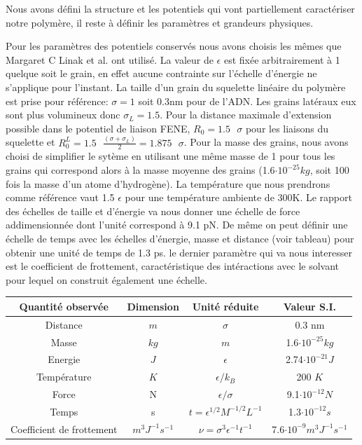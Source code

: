 Nous avons défini la structure et les potentiels qui vont partiellement caractériser notre polymère, il reste à définir les paramètres et grandeurs physiques.

Pour les paramètres des potentiels conservés nous avons choisis les mêmes que Margaret C Linak et al. \cite{jchem} ont utilisé. La valeur de $\epsilon$ est fixée arbitrairement à 1 quelque soit le grain, en effet aucune contrainte sur l'échelle d'énergie ne s'applique pour l'instant. La taille d'un grain du squelette linéaire du polymère est prise pour référence: $\sigma=1$ soit 0.3nm pour de l'ADN. Les grains latéraux eux sont plus volumineux donc $\sigma_{L}=1.5$. Pour la distance maximale d'extension possible dans le potentiel de liaison FENE, $R_0=1.5\text{ } \sigma$ pour les liaisons du squelette et $R_0^{L}=1.5 \text{ }\frac{(\sigma+\sigma_{L})}{2} = 1.875\text{ } \sigma$. Pour la masse des grains, nous avons choisi  de simplifier le sytème en utilisant une même masse de 1 pour tous les grains qui correspond alors à la masse moyenne des grains (1.6$\cdot 10^{-25} kg$, soit 100 fois la masse d'un atome d'hydrogène). La température que nous prendrons comme référence vaut 1.5 $\epsilon$ pour une température ambiente de 300K. Le rapport des échelles de taille et d'énergie va nous donner une échelle de force addimensionnée dont l'unité correspond à 9.1 pN. De même on peut définir une échelle de temps avec les échelles d'énergie, masse et distance (voir tableau) pour obtenir une unité de temps de 1.3 ps. le dernier paramètre qui va nous interesser est le coefficient de frottement, caractéristique des intéractions avec le solvant pour lequel on construit également une échelle.




\begin{center}


\begin{tabular}{|c|c|c|c|}
  \hline
  Quantité observée & Dimension & Unité réduite & Valeur S.I. \\
  \hline
  Distance & $m$ & $\sigma$ & 0.3 nm\\
  Masse & $kg$ & $m$ & 1.6$\cdot 10^{-25} kg$ \\
  Energie & $J$ & $\epsilon$ & 2.74$\cdot 10^{-21} J$\\
  Température & $K$ & $\epsilon/k_B$ & 200 $K$\\
  Force & N  & $\epsilon/\sigma$ & 9.1$\cdot 10^{-12} N$ \\
  Temps & s & $t=\epsilon^{1/2} M^{-1/2} L^{-1} $& 1.3$\cdot 10^{-12} s$\\
  Coefficient de frottement & $ m^3 J^{-1} s^{-1}$ & $ \nu= \sigma^3 \epsilon^{-1} t^{-1}$ & 7.6$\cdot 10^{-9} m^3J^{-1}s^{-1}$\\
  
  \hline
\end{tabular}

\end{center}

